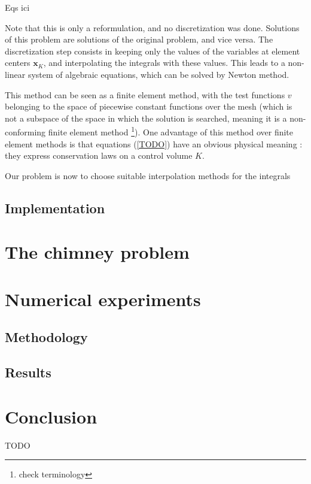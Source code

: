 \documentclass[12pt]{article}
\newcommand{\vb}[1]{\ensuremath{\mathbf{#1}}}
\begin{document}
Eqs ici

Note that this is only a reformulation, and no discretization was
done. Solutions of this problem are solutions of the original problem,
and vice versa. The discretization step consists in keeping only the
values of the variables at element centers $\vb{x}_K$, and
interpolating the integrals with these values. This leads to a
non-linear system of algebraic equations, which can be solved by
Newton method.

This method can be seen as a finite element method, with the test
functions $v$ belonging to the space of piecewise constant functions
over the mesh (which is not a subspace of the space in which the
solution is searched, meaning it is a non-conforming finite element
method \footnote{check terminology}). One advantage of this method
over finite element methods is that equations (\ref{TODO}) have an
obvious physical meaning : they express conservation laws on a control
volume $K$.

Our problem is now to choose suitable interpolation methods for the
integrals
\subsection{Implementation}
\section{The chimney problem}
\section{Numerical experiments}
\subsection{Methodology}
\subsection{Results}
\section{Conclusion}
TODO
\listoffigures


\begin{thebibliography}{99}
\end{thebibliography}
\end{document}
